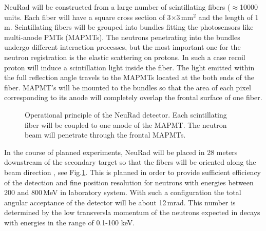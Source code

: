 \documentclass{webofc}
\begin{document}

NeuRad will be constructed from a large number of scintillating fibers ($\approx$10000 units. Each fiber will have a square cross section of 3$\times$3\,mm$^2$ and the length of 1\,m.%
Scintillating fibers will be grouped into bundles fitting the photosensors like multi-anode PMTs (MAPMTs).
The neutrons penetrating into the bundles undergo different interaction processes, but the most important one for the neutron registration is the elastic scattering on protons. In such a case recoil proton will induce a scintillation light inside the fiber. 
The light emitted within the full reflection angle travels to the MAPMTs located at the both ends of the fiber.
MAPMT's will be mounted to the bundles so that the area of each pixel corresponding to its anode will completely overlap the frontal surface of one fiber.

\begin{figure}[h]
	\caption{Operational principle of the NeuRad detector. Each scintillating fiber will be coupled to one anode of the MAPMT. The neutron beam will penetrate through the frontal MAPMTs.}
	\label{ris:neuradPrinciple}
\end{figure}

In the course of planned experiments, NeuRad will be placed in 28 meters downstream of the secondary target so that the fibers will be oriented along the beam direction \cite{report}, see Fig.\ref{ris:neuradPrinciple}.
This is planned in order to provide sufficient efficiency of the detection and fine position resolution for neutrons with energies between 200 and 800\,MeV in laboratory system.
With such a configuration the total angular acceptance of the detector will be about 12\,mrad.
This number is determined by the low transversla momentum of the neutrons expected in decays with energies in the range of 0.1-100 keV.  
\end{document}
